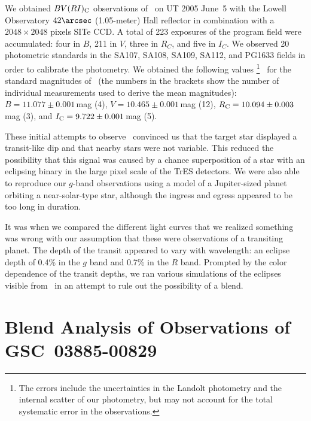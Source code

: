 We obtained $BV(RI)_{\rm C}$ observations of \gscOTE\ on UT 2005 June~5
with the Lowell Observatory $42\arcsec$ (1.05-meter) Hall reflector in
combination with a $2048 \times 2048 $ pixels SITe CCD. A total of 223
exposures of the program field were accumulated: four in $B$, 211 in
$V$, three in $R_C$, and five in $I_C$. We observed 20 photometric
standards in the SA107, SA108, SA109, SA112, and PG1633 fields
\citep{Landolt:aj:1992a} in order to calibrate the photometry. We
obtained the following values%
\footnote{The errors include the uncertainties in the Landolt
  photometry and the internal scatter of our photometry, but may not
  account for the total systematic error in the observations.}%
\ for the standard magnitudes of \gscOTE\ (the numbers in the brackets
show the number of individual measurements used to derive the mean
magnitudes): $B = 11.077 \pm 0.001$\,mag (4), $V = 10.465 \pm 0.001$\,mag (12), $R_{\rm C} = 10.094 \pm 0.003$\,mag (3), and $I_{\rm C} = 9.722 \pm 0.001$\,mag (5).

These initial attempts to observe \gscOTE\ convinced us that the target
star displayed a transit-like dip and that nearby stars were not
variable. This reduced the possibility that this signal was caused by
a chance superposition of a star with an eclipsing binary in the large
pixel scale of the TrES detectors. We were also able to reproduce our
$g$-band observations using a model of a Jupiter-sized planet
orbiting a near-solar-type star, although the ingress and egress
appeared to be too long in duration.

It was when we compared the different light curves that we realized
something was wrong with our assumption that these were observations
of a transiting planet. The depth of the transit appeared to vary with
wavelength: an eclipse depth of 0.4\% in the $g$ band and 0.7\% in the
$R$ band. Prompted by the color dependence of the transit depths, we
ran various simulations of the eclipses visible from \gscOTE\ in an
attempt to rule out the possibility of a blend.

\section{Blend Analysis of Observations of \\ \mbox{GSC 03885-00829}}
\label{cha:gsc:sec:blend}

